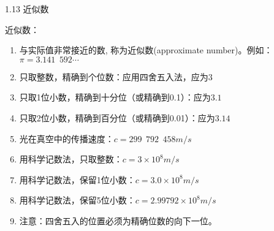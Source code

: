 \documentclass[aspectratio=169]{ctexbeamer} %
\date{\today}
\begin{document}
\begin{frame}[t]{1.13 近似数}
\begin{spacing}{1.2}
\normalsize
\alert{近似数：}
\begin{enumerate}[label={\arabic*.}]
\item 与实际值非常接近的数, 称为近似数(approximate number)。例如：\\
$\pi = 3.141\phantom{e}592\cdots$
\item 只取整数，精确到个位数：应用四舍五入法，应为$3$
\item 只取1位小数，精确到十分位（或精确到0.1）：应为$3.1$
\item 只取2位小数，精确到百分位（或精确到0.01）：应为$3.14$
\item 光在真空中的传播速度：$c=299 \phantom{e} 792 \phantom{e} 458m/s$
\item 用科学记数法，只取整数：$c=3×10^8m/s$
\item 用科学记数法，保留1位小数：$c=3.0×10^8m/s$
\item 用科学记数法，保留5位小数：$c=2.99792×10^8m/s$
\item 注意：四舍五入的位置必须为精确位数的向下一位。
\end{enumerate}

\end{spacing}
\end{frame}
\end{document}
